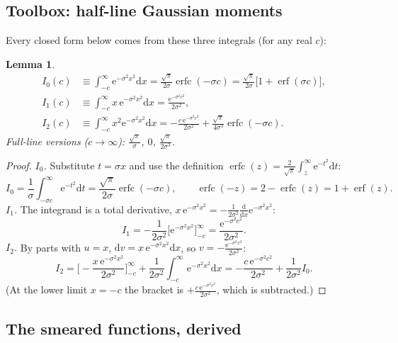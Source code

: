 \documentclass[11pt,a4paper]{article}
\numberwithin{equation}{section}
\theoremstyle{definition}
\theoremstyle{plain}
\newtheorem{lemma}[definition]{Lemma}
\theoremstyle{remark}
\numberwithin{algorithm}{section}
\newcommand{\dd}{\mathrm{d}}
\newcommand{\ee}{\mathrm{e}}
\newcommand{\erf}{\operatorname{erf}}
\newcommand{\erfc}{\operatorname{erfc}}
\begin{document}
\subsection{Toolbox: half-line Gaussian moments}\label{sec:toolbox}
Every closed form below comes from these three integrals (for any real $c$):
\begin{lemma}
\begin{align}
I_0(c)&\equiv\int_{-c}^\infty\ee^{-\sigma^2x^2}\dd x=\frac{\sqrt\pi}{2\sigma}\erfc(-\sigma c)=\frac{\sqrt\pi}{2\sigma}\big[1+\erf(\sigma c)\big],\label{eq:I0}\\
I_1(c)&\equiv\int_{-c}^\infty x\,\ee^{-\sigma^2x^2}\dd x=\frac{\ee^{-\sigma^2c^2}}{2\sigma^2},\label{eq:I1}\\
I_2(c)&\equiv\int_{-c}^\infty x^2\ee^{-\sigma^2x^2}\dd x=-\frac{c\,\ee^{-\sigma^2c^2}}{2\sigma^2}+\frac{\sqrt\pi}{4\sigma^3}\erfc(-\sigma c).\label{eq:I2}
\end{align}
Full-line versions ($c\to\infty$): $\frac{\sqrt\pi}\sigma$, $0$, $\frac{\sqrt\pi}{2\sigma^3}$.
\end{lemma}
\begin{proof}
\emph{$I_0$.} Substitute $t=\sigma x$ and use the definition $\erfc(z)=\frac2{\sqrt\pi}\int_z^\infty\ee^{-t^2}\dd t$:
\begin{equation*}
I_0=\frac1\sigma\int_{-\sigma c}^\infty\ee^{-t^2}\dd t=\frac{\sqrt\pi}{2\sigma}\erfc(-\sigma c),\qquad \erfc(-z)=2-\erfc(z)=1+\erf(z).
\end{equation*}
\emph{$I_1$.} The integrand is a total derivative, $x\,\ee^{-\sigma^2x^2}=-\frac{1}{2\sigma^2}\frac{\dd}{\dd x}\ee^{-\sigma^2x^2}$:
\begin{equation*}
I_1=-\frac1{2\sigma^2}\Big[\ee^{-\sigma^2x^2}\Big]_{-c}^\infty=\frac{\ee^{-\sigma^2c^2}}{2\sigma^2}.
\end{equation*}
\emph{$I_2$.} By parts with $u=x$, $\dd v=x\,\ee^{-\sigma^2x^2}\dd x$, so $v=-\frac{\ee^{-\sigma^2x^2}}{2\sigma^2}$:
\begin{equation*}
I_2=\Big[-\frac{x\,\ee^{-\sigma^2x^2}}{2\sigma^2}\Big]_{-c}^\infty+\frac{1}{2\sigma^2}\int_{-c}^\infty\ee^{-\sigma^2x^2}\dd x
=-\frac{c\,\ee^{-\sigma^2c^2}}{2\sigma^2}+\frac{1}{2\sigma^2}I_0 .
\end{equation*}
(At the lower limit $x=-c$ the bracket is $+\frac{c\,\ee^{-\sigma^2c^2}}{2\sigma^2}$, which is subtracted.)
\end{proof}

\subsection{The smeared functions, derived}
\end{document}
